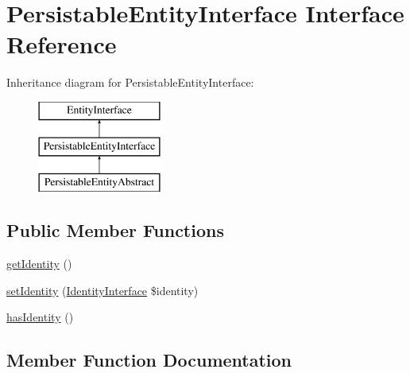 \hypertarget{interface_pes_1_1_entity_1_1_persistable_1_1_persistable_entity_interface}{}\section{Persistable\+Entity\+Interface Interface Reference}
\label{interface_pes_1_1_entity_1_1_persistable_1_1_persistable_entity_interface}
Inheritance diagram for Persistable\+Entity\+Interface\+:\begin{figure}[H]
\begin{center}
\leavevmode
\includegraphics[height=3.000000cm]{interface_pes_1_1_entity_1_1_persistable_1_1_persistable_entity_interface}
\end{center}
\end{figure}
\subsection*{Public Member Functions}
\begin{DoxyCompactItemize}
\item 
\mbox{\hyperlink{interface_pes_1_1_entity_1_1_persistable_1_1_persistable_entity_interface_a8d0c4e1299abe333956fca30fdc44143}{get\+Identity}} ()
\item 
\mbox{\hyperlink{interface_pes_1_1_entity_1_1_persistable_1_1_persistable_entity_interface_a4b592a84880ccd2d9e5483195ca2fb71}{set\+Identity}} (\mbox{\hyperlink{interface_pes_1_1_entity_1_1_persistable_1_1_identity_interface}{Identity\+Interface}} \$identity)
\item 
\mbox{\hyperlink{interface_pes_1_1_entity_1_1_persistable_1_1_persistable_entity_interface_a72a7a2baac16885815a76822b696f62b}{has\+Identity}} ()
\end{DoxyCompactItemize}


\subsection{Member Function Documentation}
\mbox{\label{interface_pes_1_1_entity_1_1_persistable_1_1_persistable_entity_interface_a8d0c4e1299abe333956fca30fdc44143}} 
